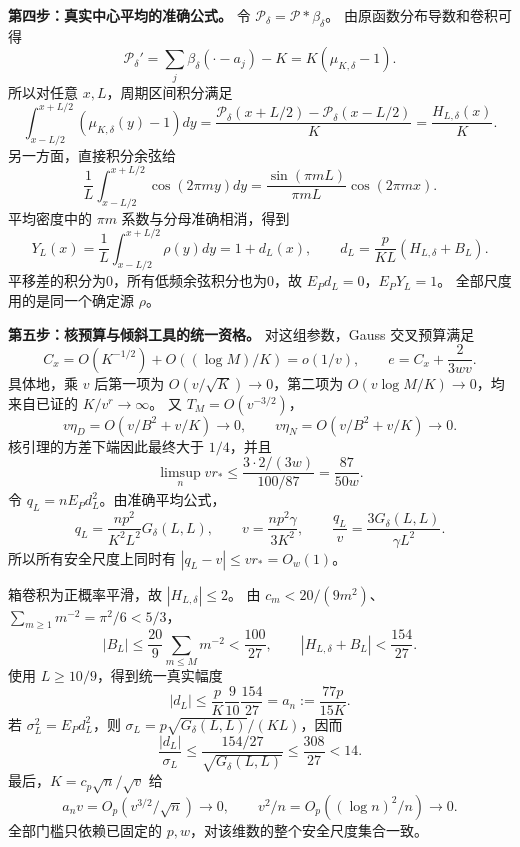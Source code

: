 \textbf{第四步：真实中心平均的准确公式。}
令 $\mathcal P_\delta=\mathcal P*\beta_\delta$。
由原函数分布导数和卷积可得
\[
 \mathcal P_\delta'=\sum_j\beta_\delta(\cdot-a_j)-K
 =K(\mu_{K,\delta}-1).
\]
所以对任意 $x,L$，周期区间积分满足
\[
 \int_{x-L/2}^{x+L/2}(\mu_{K,\delta}(y)-1)dy
 =\frac{\mathcal P_\delta(x+L/2)-\mathcal P_\delta(x-L/2)}K
 =\frac{H_{L,\delta}(x)}K.
\]
另一方面，直接积分余弦给
\[
 \frac1L\int_{x-L/2}^{x+L/2}\cos(2\pi my)dy
 =\frac{\sin(\pi mL)}{\pi mL}\cos(2\pi mx).
\]
平均密度中的 $\pi m$ 系数与分母准确相消，得到
\begin{equation}\label{eq:papersourceaverage}
 Y_L(x)=\frac1L\int_{x-L/2}^{x+L/2}\rho(y)dy=1+d_L(x),
 \qquad d_L=\frac p{KL}(H_{L,\delta}+B_L).
\end{equation}
平移差的积分为0，所有低频余弦积分也为0，故 $E_Pd_L=0$，$E_PY_L=1$。
全部尺度用的是同一个确定源 $\rho$。

\textbf{第五步：核预算与倾斜工具的统一资格。}
对这组参数，Gauss 交叉预算满足
\[
 C_x=O(K^{-1/2})+O((\log M)/K)=o(1/v),
 \qquad e=C_x+\frac2{3wv}.
\]
具体地，乘 $v$ 后第一项为 $O(v/\sqrt K)\to0$，第二项为
$O(v\log M/K)\to0$，均来自已证的 $K/v^r\to\infty$。
又 $T_M=O(v^{-3/2})$，
\[
 v\eta_D=O(v/B^2+v/K)\to0,
 \qquad v\eta_N=O(v/B^2+v/K)\to0.
\]
核引理的方差下端因此最终大于 $1/4$，并且
\[
 \limsup_n vr_*
 \le\frac{3\cdot2/(3w)}{100/87}=\frac{87}{50w}.
\]
令 $q_L=nE_Pd_L^2$。由准确平均公式，
\[
 q_L=\frac{np^2}{K^2L^2}G_\delta(L,L),\qquad
 v=\frac{np^2\gamma}{3K^2},\qquad
 \frac{q_L}{v}=\frac{3G_\delta(L,L)}{\gamma L^2}.
\]
所以所有安全尺度上同时有 $|q_L-v|\le vr_*=O_w(1)$。

箱卷积为正概率平滑，故 $|H_{L,\delta}|\le2$。
由 $c_m<20/(9m^2)$、$\sum_{m\ge1}m^{-2}=\pi^2/6<5/3$，
\[
 |B_L|\le\frac{20}9\sum_{m\le M}m^{-2}<\frac{100}{27},
 \qquad|H_{L,\delta}+B_L|<\frac{154}{27}.
\]
使用 $L\ge10/9$，得到统一真实幅度
\[
 |d_L|\le\frac pK\frac9{10}\frac{154}{27}
 =a_n:=\frac{77p}{15K}.
\]
若 $\sigma_L^2=E_Pd_L^2$，则
$\sigma_L=p\sqrt{G_\delta(L,L)}/(KL)$，因而
\[
 \frac{|d_L|}{\sigma_L}\le
 \frac{154/27}{\sqrt{G_\delta(L,L)}}\le\frac{308}{27}<14.
\]
最后，$K=c_p\sqrt n/\sqrt v$ 给
\[
 a_nv=O_p(v^{3/2}/\sqrt n)\to0,
 \qquad v^2/n=O_p((\log n)^2/n)\to0.
\]
全部门槛只依赖已固定的 $p,w$，对该维数的整个安全尺度集合一致。
